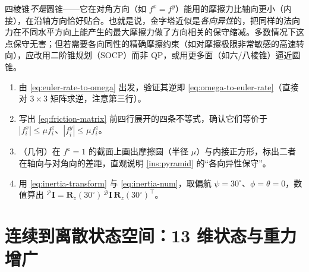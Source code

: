 \begin{pitfall}
四棱锥\emph{不是}圆锥——它在对角方向（如 $f^x=f^y$）能用的摩擦力比轴向更小（内接），在沿轴方向恰好贴合。也就是说，金字塔近似是\emph{各向异性}的，把同样的法向力在不同水平方向上能产生的最大摩擦力做了方向相关的保守缩减。多数情况下这点保守无害；但若需要各向同性的精确摩擦约束（如对摩擦极限非常敏感的高速转向），应改用二阶锥规划（SOCP）而非 QP，或用更多面（如六/八棱锥）逼近圆锥。
\end{pitfall}

\begin{practice}
\begin{enumerate}
  \item 由 \cref{eq:euler-rate-to-omega} 出发，验证其逆即 \cref{eq:omega-to-euler-rate}（直接对 $3\times3$ 矩阵求逆，注意第三行）。
  \item 写出 \cref{eq:friction-matrix} 前四行展开的四条不等式，确认它们等价于 $|f_i^x|\le\mu f_i^z$、$|f_i^y|\le\mu f_i^z$。
  \item （几何）在 $f^z=1$ 的截面上画出摩擦圆（半径 $\mu$）与内接正方形，标出二者在轴向与对角向的差距，直观说明 \cref{ins:pyramid} 的“各向异性保守”。
  \item 用 \cref{eq:inertia-transform} 与 \cref{eq:inertia-num}，取偏航 $\psi=30^\circ$、$\phi=\theta=0$，数值算出 ${}^{\mathcal{P}}\mathbf{I}=\mathbf{R}_z(30^\circ)\,{}^{\mathcal{B}}\mathbf{I}\,\mathbf{R}_z(30^\circ)^\top$。
\end{enumerate}
\end{practice}

\section{连续到离散状态空间：13 维状态与重力增广}
\label{sec:state-space}


